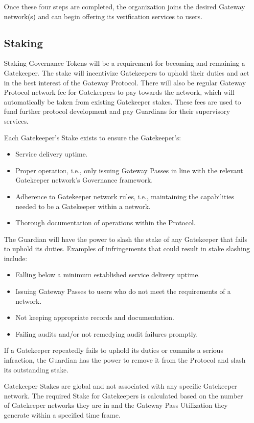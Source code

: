 Once these four steps are completed, the organization joins the desired Gateway network(s) and can begin offering its verification services to users.

\subsection{Staking}

Staking Governance Tokens will be a requirement for becoming and remaining a Gatekeeper. The stake will incentivize Gatekeepers to uphold their duties and act in the best interest of the Gateway Protocol. There will also be regular Gateway Protocol network fee for Gatekeepers to pay towards the network, which will automatically be taken from existing Gatekeeper stakes.
These fees are used to fund further protocol development and pay Guardians for their supervisory services.

Each Gatekeeper’s Stake exists to ensure the Gatekeeper’s:

\begin{itemize}
\item Service delivery uptime.
\item Proper operation, i.e., only issuing Gateway Passes in line with the relevant Gatekeeper network’s Governance framework.
\item Adherence to Gatekeeper network rules, i.e., maintaining the capabilities needed to be a Gatekeeper within a network.
\item Thorough documentation of operations within the Protocol.
\end{itemize}

The Guardian will have the power to slash the stake of any Gatekeeper that fails to uphold its duties. Examples of infringements that could result in stake slashing include:

\begin{itemize}
\item Falling below a minimum established service delivery uptime.
\item Issuing Gateway Passes to users who do not meet the requirements of a network.
\item Not keeping appropriate records and documentation.
\item Failing audits and/or not remedying audit failures promptly.
\end{itemize}

If a Gatekeeper repeatedly fails to uphold its duties or commits a serious infraction, the Guardian has the power to remove it from the Protocol and slash its outstanding stake.

Gatekeeper Stakes are global and not associated with any specific Gatekeeper network. The required Stake for Gatekeepers is calculated based on the number of Gatekeeper networks they are in and the Gateway Pass Utilization they generate within a specified time frame.
